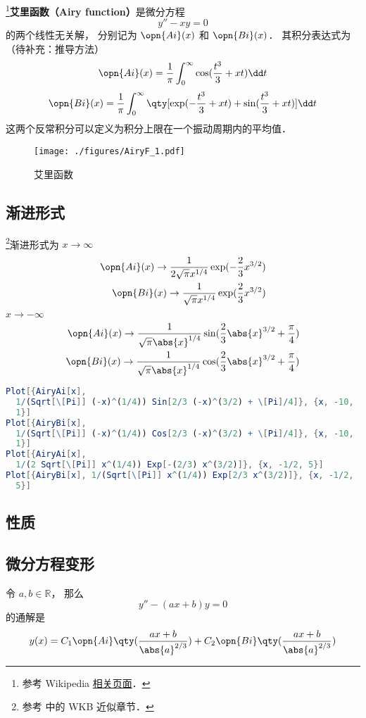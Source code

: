 
\begin{issues}
\issueDraft
\end{issues}

\footnote{参考 Wikipedia \href{https://en.wikipedia.org/wiki/Airy_function}{相关页面}．}\textbf{艾里函数（Airy function）}是微分方程
\begin{equation}
y'' - xy = 0
\end{equation}
的两个线性无关解， 分别记为 $\opn{Ai}(x)$ 和 $\opn{Bi}(x)$． 其积分表达式为（待补充：推导方法）
\begin{equation}
\opn{Ai}(x)=\frac 1\pi \int_0^\infty \cos(\frac{t^3}{3}+xt)\dd t
\end{equation}
\begin{equation}
\opn{Bi}(x)=\frac 1\pi \int_0^\infty \qty[\exp(-\frac{t^3}{3}+xt)+\sin(\frac{t^3}{3}+xt)]\dd t
\end{equation}
这两个反常积分可以定义为积分上限在一个振动周期内的平均值．

\begin{figure}[ht]
\centering
\texttt{[image: ./figures/AiryF\_1.pdf]}
\caption{艾里函数} \label{AiryF_fig1}
\end{figure}

\subsection{渐进形式}
\footnote{参考 \cite{GriffQ} 中的 WKB 近似章节．}渐进形式为 $x \to \infty$
\begin{align}
\opn{Ai}(x) \to \frac{1}{2\sqrt{\pi} x^{1/4}} \exp(-\frac{2}{3}x^{3/2})\\
\opn{Bi}(x) \to \frac{1}{\sqrt{\pi} x^{1/4}} \exp(\frac{2}{3}x^{3/2})
\end{align}
$x \to -\infty$
\begin{align}
\opn{Ai}(x) \to \frac{1}{\sqrt{\pi} \abs{x}^{1/4}} \sin(\frac{2}{3}\abs{x}^{3/2}+\frac{\pi}{4})\\
\opn{Bi}(x) \to \frac{1}{\sqrt{\pi} \abs{x}^{1/4}} \cos(\frac{2}{3}\abs{x}^{3/2}+\frac{\pi}{4})
\end{align}

\begin{lstlisting}[language=Mathematica]
Plot[{AiryAi[x], 
  1/(Sqrt[\[Pi]] (-x)^(1/4)) Sin[2/3 (-x)^(3/2) + \[Pi]/4]}, {x, -10, 
  1}]
Plot[{AiryBi[x], 
  1/(Sqrt[\[Pi]] (-x)^(1/4)) Cos[2/3 (-x)^(3/2) + \[Pi]/4]}, {x, -10, 
  1}]
Plot[{AiryAi[x], 
  1/(2 Sqrt[\[Pi]] x^(1/4)) Exp[-(2/3) x^(3/2)]}, {x, -1/2, 5}]
Plot[{AiryBi[x], 1/(Sqrt[\[Pi]] x^(1/4)) Exp[2/3 x^(3/2)]}, {x, -1/2, 
  5}]
\end{lstlisting}
\subsection{性质}
\subsection{微分方程变形}
令 $a, b\in \mathbb R$， 那么
\begin{equation}
y'' - (ax + b) y = 0
\end{equation}
的通解是
\begin{equation}\label{AiryF_eq1}
y(x) = C_1\opn{Ai}\qty(\frac{ax+b}{\abs{a}^{2/3}}) + C_2 \opn{Bi}\qty(\frac{ax+b}{\abs{a}^{2/3}})
\end{equation}
